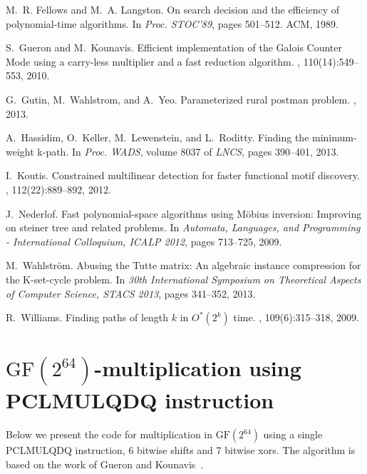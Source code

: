 \documentclass[11pt]{article}
\newcommand{\field}[1]{{\textrm{GF}}({#1})}
\begin{document}
\begin{thebibliography}{10}
M.~R. Fellows and M.~A. Langston.
\newblock On search decision and the efficiency of polynomial-time algorithms.
\newblock In {\em Proc. STOC'89}, pages 501--512. ACM, 1989.

S.~Gueron and M.~Kounavis.
\newblock Efficient implementation of the {G}alois {C}ounter {M}ode using a
  carry-less multiplier and a fast reduction algorithm.
, 110(14):549--553, 2010.

G.~Gutin, M.~Wahlstrom, and A.~Yeo.
\newblock Parameterized rural postman problem.
, 2013.

A.~Hassidim, O.~Keller, M.~Lewenstein, and L.~Roditty.
\newblock Finding the minimum-weight k-path.
\newblock In {\em Proc. WADS}, volume 8037 of {\em LNCS}, pages 390--401, 2013.

I.~Koutis.
\newblock Constrained multilinear detection for faster functional motif
  discovery.
, 112(22):889--892, 2012.

J.~Nederlof.
\newblock Fast polynomial-space algorithms using {M}{\"o}bius inversion:
  Improving on steiner tree and related problems.
\newblock In {\em Automata, Languages, and Programming - International
  Colloquium, ICALP 2012}, pages 713--725, 2009.

M.~Wahlstr{\"o}m.
\newblock Abusing the {T}utte matrix: An algebraic instance compression for the
  {K}-set-cycle problem.
\newblock In {\em 30th International Symposium on Theoretical Aspects of
  Computer Science, STACS 2013}, pages 341--352, 2013.

R.~Williams.
\newblock Finding paths of length {$k$} in {$O^*(2^k)$} time.
, 109(6):315--318, 2009.

\end{thebibliography}

\newpage

\appendix

 \section{$\field{2^{64}}$-multiplication using PCLMULQDQ instruction}
 \label{sec:clmul-code}
 
 Below we present the code for multiplication in $\field{2^{64}}$ using a single PCLMULQDQ instruction, 6 bitwise shifts and 7 bitwise xors.
 The algorithm is based on the work of Gueron and Kounavis~\cite{gueron2010efficient}.
 
\end{document}
